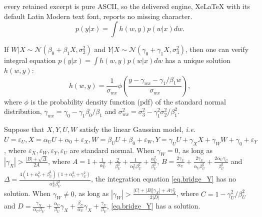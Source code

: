 \documentclass[10pt,a4paper]{amsart}
\def\cN{\mathcal{N}}
\begin{document}
every retained excerpt is pure ASCII, so the delivered engine, XeLaTeX with its default Latin Modern text font, reports no missing character.
\begin{equation}\label{eq.bridge_Y}
    p(y|x) = \int h(w,y) p(w|x) dw.
\end{equation}

\begin{lemma}
\label{lemma.miao-example}
 If $W|X\sim \cN(\beta_0+\beta_1X,\sigma_{2}^{2})$ and $Y|X\sim \cN(\gamma_0+\gamma_1X,\sigma_{3}^{2})$, then one can verify integral equation $p(y|x)=\int h(w,y)p(w|x)dw$ has a unique solution $h(w,y)$:
\begin{equation}\label{eq.true_solution}
    h(w,y)=\frac{1}{\sigma_{wx}}\phi \left( \frac{y-\gamma_{wx}-\gamma_1/\beta_1 w}{\sigma_{wx}} \right),
\end{equation}
where $\phi$ is the probability density function (pdf) of the standard normal distribution, $\gamma_{wx}=\gamma_{0}-\gamma_{1}\beta_{0}/\beta_{1}$ and $\sigma_{wx}^2=\sigma_3^2-\gamma_1^2\sigma_2^2/\beta_1^2$.
\end{lemma}

\begin{proposition}
Suppose that $X, Y, U, W$ satisfy the linear Gaussian model, \emph{i.e.} $U=\varepsilon_U,X =\alpha_U U + \alpha_0+\varepsilon_X,W =\beta_U U +\beta_0 + \varepsilon_W, Y=\gamma_U U +\gamma_X X+\gamma_W W +\gamma_0 +\varepsilon_Y$, where $\varepsilon_X, \varepsilon_W, \varepsilon_Y, \varepsilon_U$ are standard normal. When $\gamma_W = 0$, as long as $|\gamma_X|>\frac{|B|+\sqrt{\Delta}}{2A}$, where $A=1+\frac{1}{\alpha_{U}^{2}}+\frac{2}{\beta_{U}^{2}}+\frac{1}{\alpha_{U}^{2}\beta_{U}^{2}}+\frac{\alpha_{U}^{2}}{\beta_{U}^{2}}$, $B=\frac{2\gamma_U}{\alpha_U}+\frac{2\gamma_U}{\alpha_U\beta_{U}^{2}}+\frac{2\alpha_U\gamma_U}{\beta_{U}^{2}}$ and $\Delta=\frac{4\left( 1+\alpha_{U}^{2}+\beta_{U}^{2} \right) \left( 1+\alpha_{U}^{2}+\gamma_{U}^{2} \right)}{\alpha_{U}^{2}\beta_{U}^{2}}$, the integration equation \eqref{eq.bridge_Y} has no solution. When $\gamma_W \ne 0$, as long as $|\gamma_W|>\frac{|C|+|B||\gamma_X|+A\gamma_X^2}{2|D|}$, where $C=1-\gamma_U^2/\beta_U^2$ and $D=\frac{\gamma_X}{\alpha_U\beta_U}+\frac{\alpha_U}{\beta_U}\gamma_X+\frac{\beta_U}{\alpha_U}\gamma_X+\frac{\gamma_U}{\beta_U}$, \eqref{eq.bridge_Y} has a solution. 
\end{proposition}
\end{document}
